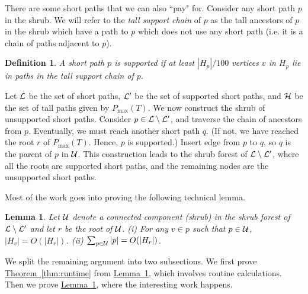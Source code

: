 \documentclass[11pt]{article}
\newcommand{\ignore}[1]{}
\newtheorem{lemma}[theorem]{Lemma}
\newtheorem{definition}[theorem]{Definition}
\theoremstyle{definition}
\newcommand{\cH}{{\cal H}}
\newcommand{\cL}{{\cal L}}
\newcommand{\cU}{{\cal U}}
\newcommand{\Sec}[1]{\hyperref[sec:#1]{\S\ref*{sec:#1}}} %
\newcommand{\Thm}[1]{\hyperref[thm:#1]{Theorem~\ref*{thm:#1}}} %
\newcommand{\Lem}[1]{\hyperref[lem:#1]{Lemma~\ref*{lem:#1}}} %
\newcommand{\pmax}{P_{\max}}
\begin{document}
\ignore{
For a short path $p$ we can think of the quantity $|p|(\log |H_p| - \log |p|)$ as the excess of $p$, i.e. what was not ``paid for'' locally by $p$.
Our eventual goal will be to show that by choosing the right path decomposition, this excess 
can be recharged to tall paths. In the next couple sections we introduce the appropriate path decomposition and prove 
some useful facts about it.  Then given these facts, in \Sec{} we are able to make the recharging argument.
}

There are some short paths that we can also ``pay" for.  Consider any short path $p$ in the shrub.  We will refer to the 
\emph{tall support chain} of $p$ as the tall ancestors of $p$ in the shrub which have a path to $p$ which does not use any 
short path (i.e. it is a chain of paths adjacent to $p$).

\begin{definition} \label{def:support} A short path $p$ is \emph{supported} if
at least $|H_p|/100$ vertices $v$ in $H_p$ lie in paths in the tall support chain of $p$.
%
%
\end{definition}

Let $\cL$ be the set of short paths, $\cL'$ be the set of supported short paths, and $\cH$ be the set of tall paths
given by $\pmax(T)$.
We now construct the shrub of unsupported short paths. Consider $p \in \cL \setminus \cL'$,
and traverse the chain of ancestors from $p$. Eventually, we must reach another short path $q$.
(If not, we have reached the root $r$ of $\pmax(T)$. Hence, $p$ is supported.)
Insert edge from $p$ to $q$, so $q$ is the parent of $p$ in $\cU$. This construction leads
to the shrub forest of $\cL \setminus \cL'$, where all the roots are supported short paths, 
and the remaining nodes are the unsupported short paths.

Most of the work goes into proving the following technical lemma.

\begin{lemma} \label{lem:cu-root} Let $\cU$ denote a connected component (shrub) in the shrub forest of $\cL \setminus \cL'$ and let $r$
be the root of $\cU$. (i) For any $v \in p$ such that $p \in \cU$,
$|H_v| = O(|H_r|)$. (ii) $\sum_{p \in \cU} |p| = O(|H_r|)$.
\end{lemma}

We split the remaining argument into two subsections. We first prove \Thm{runtime} from \Lem{cu-root},
which involves routine calculations. Then we prove \Lem{cu-root}, where the interesting work happens.
\end{document}
